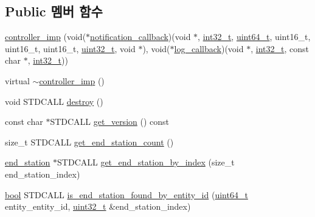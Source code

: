 \subsection*{Public 멤버 함수}
\begin{DoxyCompactItemize}
\item 
\hyperlink{classavdecc__lib_1_1controller__imp_af074c5493405491413ecde9ecfead982}{controller\+\_\+imp} (void($\ast$\hyperlink{notification__main_8cpp_a0ac846a129e0f5cc0f199a57f19dcdf0}{notification\+\_\+callback})(void $\ast$, \hyperlink{parse_8c_a37994e3b11c72957c6f454c6ec96d43d}{int32\+\_\+t}, \hyperlink{parse_8c_aec6fcb673ff035718c238c8c9d544c47}{uint64\+\_\+t}, uint16\+\_\+t, uint16\+\_\+t, uint16\+\_\+t, \hyperlink{parse_8c_a6eb1e68cc391dd753bc8ce896dbb8315}{uint32\+\_\+t}, void $\ast$), void($\ast$\hyperlink{log__main_8cpp_ada1b24c3a6e3b693689b6af49d269216}{log\+\_\+callback})(void $\ast$, \hyperlink{parse_8c_a37994e3b11c72957c6f454c6ec96d43d}{int32\+\_\+t}, const char $\ast$, \hyperlink{parse_8c_a37994e3b11c72957c6f454c6ec96d43d}{int32\+\_\+t}))
\item 
virtual \hyperlink{classavdecc__lib_1_1controller__imp_acda34a78865a513c9d434a7ed3378888}{$\sim$controller\+\_\+imp} ()
\item 
void S\+T\+D\+C\+A\+LL \hyperlink{classavdecc__lib_1_1controller__imp_a644cfaa829dbec5c28d5d29a6789e8c4}{destroy} ()
\item 
const char $\ast$S\+T\+D\+C\+A\+LL \hyperlink{classavdecc__lib_1_1controller__imp_ad7a263457cb718b9bd691111f2aa6fae}{get\+\_\+version} () const 
\item 
size\+\_\+t S\+T\+D\+C\+A\+LL \hyperlink{classavdecc__lib_1_1controller__imp_a1b967920b78662c203e0b9bd43dca22c}{get\+\_\+end\+\_\+station\+\_\+count} ()
\item 
\hyperlink{classavdecc__lib_1_1end__station}{end\+\_\+station} $\ast$S\+T\+D\+C\+A\+LL \hyperlink{classavdecc__lib_1_1controller__imp_a4ef84abdcae16ade7de4d4c037214df4}{get\+\_\+end\+\_\+station\+\_\+by\+\_\+index} (size\+\_\+t end\+\_\+station\+\_\+index)
\item 
\hyperlink{avb__gptp_8h_af6a258d8f3ee5206d682d799316314b1}{bool} S\+T\+D\+C\+A\+LL \hyperlink{classavdecc__lib_1_1controller__imp_a1aa82b02b43f07542271b68080eab361}{is\+\_\+end\+\_\+station\+\_\+found\+\_\+by\+\_\+entity\+\_\+id} (\hyperlink{parse_8c_aec6fcb673ff035718c238c8c9d544c47}{uint64\+\_\+t} entity\+\_\+entity\+\_\+id, \hyperlink{parse_8c_a6eb1e68cc391dd753bc8ce896dbb8315}{uint32\+\_\+t} \&end\+\_\+station\+\_\+index)
\item 

\end{DoxyCompactItemize}
